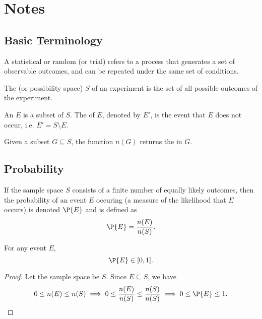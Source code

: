 \section{Notes}

\subsection{Basic Terminology}

\begin{definition}
    A statistical or random  (or trial) refers to a process that generates a set of observable outcomes, and can be repeated under the same set of conditions.
\end{definition}

\begin{definition}
    The  (or possibility space) $S$ of an experiment is the set of all possible outcomes of the experiment.
\end{definition}

\begin{definition}
    An  $E$ is a subset of $S$. The  of $E$, denoted by $E'$, is the event that $E$ does not occur, i.e. $E' = S \setminus E$.
\end{definition}

\begin{definition}
    Given a subset $G \subseteq S$, the function $n(G)$ returns the  in $G$.
\end{definition}

\subsection{Probability}

\begin{definition}
    If the sample space $S$ consists of a finite number of equally likely outcomes, then the probability of an event $E$ occuring (a measure of the likelihood that $E$ occurs) is denoted $\P{E}$ and is defined as \[\P{E} = \frac{n(E)}{n(S)}.\]
\end{definition}

\begin{proposition}
    For any event $E$, \[\P{E} \in [0, 1].\]
\end{proposition}
\begin{proof}
    Let the sample space be $S$. Since $E \subseteq S$, we have \[0 \leq n(E) \leq n(S) \implies 0 \leq \frac{n(E)}{n(S)} \leq \frac{n(S)}{n(S)} \implies 0 \leq \P{E} \leq 1.\]
\end{proof}


